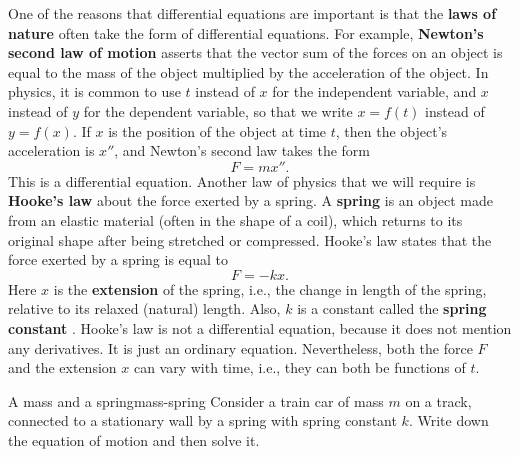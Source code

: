 One of the reasons that differential equations are important is that
the \textbf{laws of nature}%
 often take the form of differential equations.
For example, \textbf{Newton's second law of motion} asserts that the
vector sum of the forces on an object is equal to the mass of the
object multiplied by the acceleration of the object. In physics, it is
common to use $t$ instead of $x$ for the independent variable, and $x$
instead of $y$ for the dependent variable, so that we write $x=f(t)$
instead of $y=f(x)$. If $x$ is the position of the object at time $t$,
then the object's acceleration is $x''$, and Newton's second law takes
the form
\begin{equation*}
  F = mx''.
\end{equation*}
This is a differential equation. Another law of physics that we will
require is \textbf{Hooke's law}%
%
 about the force exerted by a spring. A
\textbf{spring}%
 is an object made from an elastic material
(often in the shape of a coil), which returns to its original shape
after being stretched or compressed. Hooke's law states that the force
exerted by a spring is equal to
\begin{equation*}
  F = -k x.
\end{equation*}
Here $x$ is the \textbf{extension}%
 of the spring, i.e., the change
in length of the spring, relative to its relaxed (natural)
length. Also, $k$ is a constant called the \textbf{spring constant}%
. Hooke's law
is not a differential equation, because it does not mention any
derivatives. It is just an ordinary equation. Nevertheless, both the
force $F$ and the extension $x$ can vary with time, i.e., they can
both be functions of $t$.

\begin{example}{A mass and a spring}{mass-spring}
  Consider a train car of mass $m$ on a track, connected to a
  stationary wall by a spring with spring constant $k$. Write down the
  equation of motion and then solve it.
  \begin{center}
  \end{center}
\end{example}

